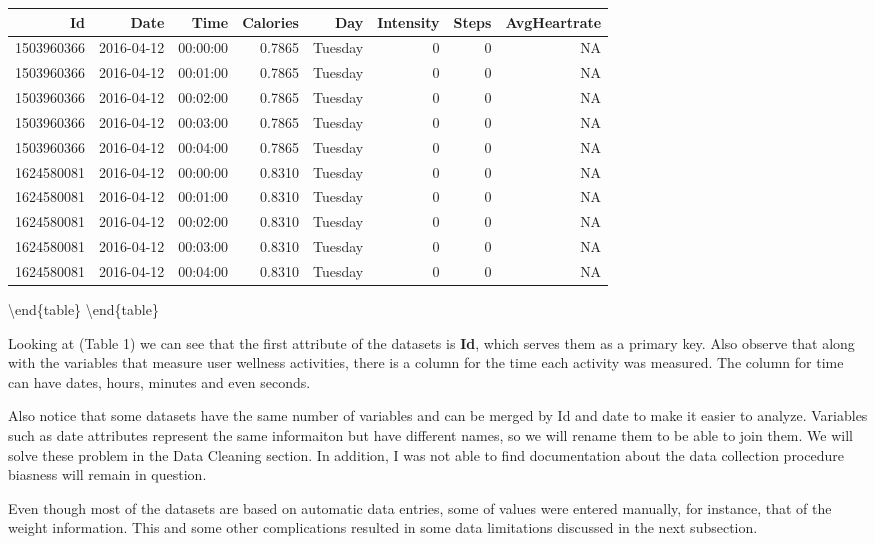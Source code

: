\documentclass[
]{article}
\begin{document}
\begin{tabular}[t]{r|r|r|r|r|r|r|r}
\hline
Id & Date & Time & Calories & Day & Intensity & Steps & AvgHeartrate\\
\hline
1503960366 & 2016-04-12 & 00:00:00 & 0.7865 & Tuesday & 0 & 0 & NA\\
\hline
1503960366 & 2016-04-12 & 00:01:00 & 0.7865 & Tuesday & 0 & 0 & NA\\
\hline
1503960366 & 2016-04-12 & 00:02:00 & 0.7865 & Tuesday & 0 & 0 & NA\\
\hline
1503960366 & 2016-04-12 & 00:03:00 & 0.7865 & Tuesday & 0 & 0 & NA\\
\hline
1503960366 & 2016-04-12 & 00:04:00 & 0.7865 & Tuesday & 0 & 0 & NA\\
\hline
1624580081 & 2016-04-12 & 00:00:00 & 0.8310 & Tuesday & 0 & 0 & NA\\
\hline
1624580081 & 2016-04-12 & 00:01:00 & 0.8310 & Tuesday & 0 & 0 & NA\\
\hline
1624580081 & 2016-04-12 & 00:02:00 & 0.8310 & Tuesday & 0 & 0 & NA\\
\hline
1624580081 & 2016-04-12 & 00:03:00 & 0.8310 & Tuesday & 0 & 0 & NA\\
\hline
1624580081 & 2016-04-12 & 00:04:00 & 0.8310 & Tuesday & 0 & 0 & NA\\
\hline
\end{tabular}

\textbackslash end\{table\} \textbackslash end\{table\}

Looking at (Table 1) we can see that the first attribute of the datasets
is \textbf{Id}, which serves them as a primary key. Also observe that
along with the variables that measure user wellness activities, there is
a column for the time each activity was measured. The column for time
can have dates, hours, minutes and even seconds.

Also notice that some datasets have the same number of variables and can
be merged by Id and date to make it easier to analyze. Variables such as
date attributes represent the same informaiton but have different names,
so we will rename them to be able to join them. We will solve these
problem in the Data Cleaning section. In addition, I was not able to
find documentation about the data collection procedure biasness will
remain in question.

Even though most of the datasets are based on automatic data entries,
some of values were entered manually, for instance, that of the weight
information. This and some other complications resulted in some data
limitations discussed in the next subsection.
\end{document}
